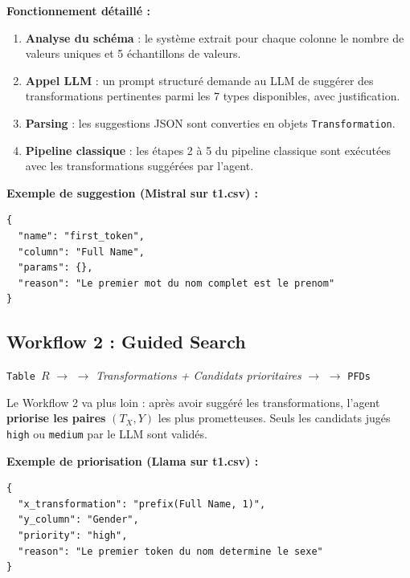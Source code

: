 \documentclass[12pt,a4paper]{article}
\begin{document}
\textbf{Fonctionnement d\'{e}taill\'{e} :}

\begin{enumerate}
    \item \textbf{Analyse du sch\'{e}ma} : le syst\`{e}me extrait pour chaque colonne le nombre de valeurs uniques et 5 \'{e}chantillons de valeurs.
    \item \textbf{Appel LLM} : un prompt structur\'{e} demande au LLM de sugg\'{e}rer des transformations pertinentes parmi les 7 types disponibles, avec justification.
    \item \textbf{Parsing} : les suggestions JSON sont converties en objets \texttt{Transformation}.
    \item \textbf{Pipeline classique} : les \'{e}tapes 2 \`{a} 5 du pipeline classique sont ex\'{e}cut\'{e}es avec les transformations sugg\'{e}r\'{e}es par l'agent.
\end{enumerate}

\textbf{Exemple de suggestion (Mistral sur t1.csv) :}
\begin{lstlisting}[language={},basicstyle=\ttfamily\small]
{
  "name": "first_token",
  "column": "Full Name",
  "params": {},
  "reason": "Le premier mot du nom complet est le prenom"
}
\end{lstlisting}

\subsection{Workflow 2 : Guided Search}

\begin{tcolorbox}[colback=green!5!white, colframe=green!50!black, title=Workflow 2 -- Guided Search]
\begin{center}
\texttt{Table $R$} $\rightarrow$  $\rightarrow$ \textit{Transformations + Candidats prioritaires} $\rightarrow$  $\rightarrow$ \texttt{PFDs}
\end{center}
\end{tcolorbox}

Le Workflow 2 va plus loin : apr\`{e}s avoir sugg\'{e}r\'{e} les transformations, l'agent \textbf{priorise les paires} $(T_X, Y)$ les plus prometteuses. Seuls les candidats jug\'{e}s \texttt{high} ou \texttt{medium} par le LLM sont valid\'{e}s.

\textbf{Exemple de priorisation (Llama sur t1.csv) :}
\begin{lstlisting}[language={},basicstyle=\ttfamily\small]
{
  "x_transformation": "prefix(Full Name, 1)",
  "y_column": "Gender",
  "priority": "high",
  "reason": "Le premier token du nom determine le sexe"
}
\end{lstlisting}
\end{document}
